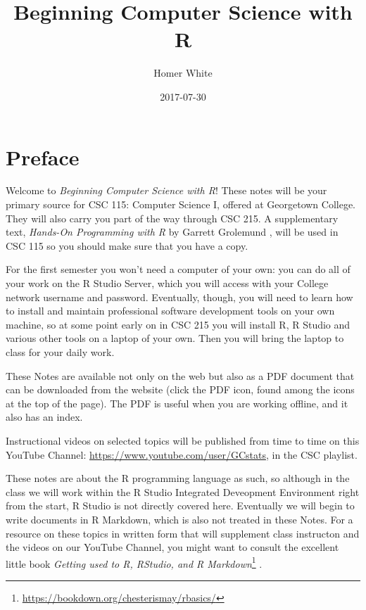 \documentclass[]{book}
\title{Beginning Computer Science with R}
\author{Homer White}
\date{2017-07-30}
\let\rmarkdownfootnote\footnote%
\def\footnote{\protect\rmarkdownfootnote}
\renewcommand{\href}[2]{#2\footnote{\url{#1}}}
\renewcommand{\href}[2]{#2\footnote{\url{#1}}}
\theoremstyle{definition}
\theoremstyle{definition}
\theoremstyle{remark}
\begin{document}
\maketitle

{
\setcounter{tocdepth}{1}
\tableofcontents
}
\chapter*{Preface}\label{preface}

Welcome to \emph{Beginning Computer Science with R}! These notes will be
your primary source for CSC 115: Computer Science I, offered at
Georgetown College. They will also carry you part of the way through CSC
215. A supplementary text, \emph{Hands-On Programming with R} by Garrett
Grolemund \citep{Grolemund2014}, will be used in CSC 115 so you should
make sure that you have a copy.

For the first semester you won't need a computer of your own: you can do
all of your work on the R Studio Server, which you will access with your
College network username and password. Eventually, though, you will need
to learn how to install and maintain professional software development
tools on your own machine, so at some point early on in CSC 215 you will
install R, R Studio and various other tools on a laptop of your own.
Then you will bring the laptop to class for your daily work.

These Notes are available not only on the web but also as a PDF document
that can be downloaded from the website (click the PDF icon, found among
the icons at the top of the page). The PDF is useful when you are
working offline, and it also has an index.

Instructional videos on selected topics will be published from time to
time on this YouTube Channel:
\url{https://www.youtube.com/user/GCstats}, in the CSC playlist.

These notes are about the R programming language as such, so although in
the class we will work within the R Studio Integrated Deveopment
Environment right from the start, R Studio is not directly covered here.
Eventually we will begin to write documents in R Markdown, which is also
not treated in these Notes. For a resource on these topics in written
form that will supplement class instructon and the videos on our YouTube
Channel, you might want to consult the excellent little book
\href{https://bookdown.org/chesterismay/rbasics/}{\emph{Getting used to
R, RStudio, and R Markdown}} \citep{Ismay2016}.
\end{document}
